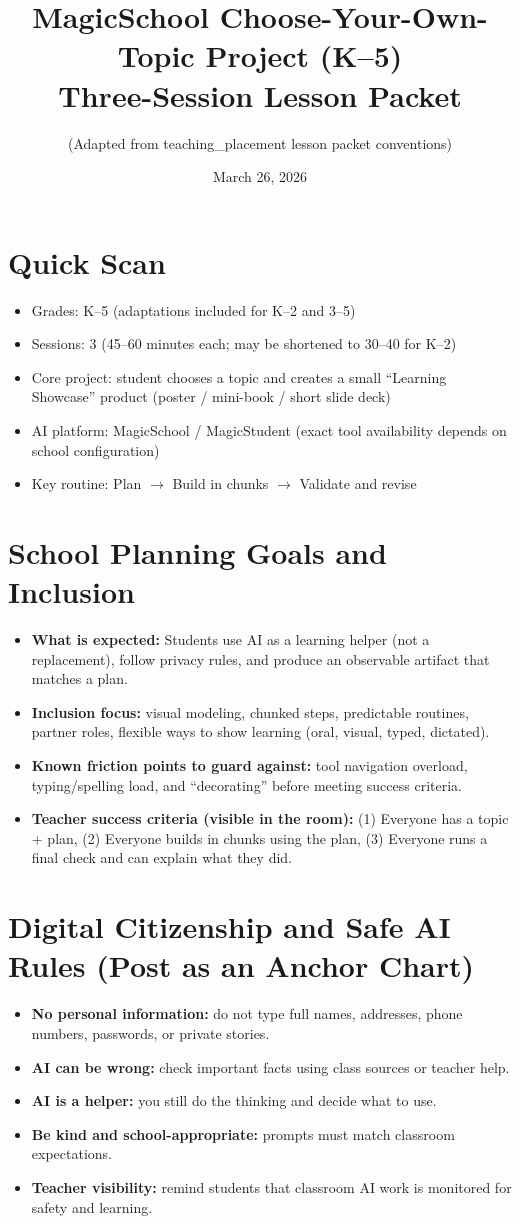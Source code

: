 \documentclass[11pt]{article}
\title{MagicSchool Choose-Your-Own-Topic Project (K--5)\\\large Three-Session Lesson Packet}
\author{(Adapted from teaching\_placement lesson packet conventions)}
\date{March 26, 2026}
\newcommand{\Session}[1]{\section*{#1}}
\begin{document}
\maketitle

\Session{Quick Scan}
\begin{itemize}[leftmargin=*]
  \item Grades: K--5 (adaptations included for K--2 and 3--5)
  \item Sessions: 3 (45--60 minutes each; may be shortened to 30--40 for K--2)
  \item Core project: student chooses a topic and creates a small ``Learning Showcase'' product (poster / mini-book / short slide deck)
  \item AI platform: MagicSchool / MagicStudent (exact tool availability depends on school configuration)
  \item Key routine: Plan $\rightarrow$ Build in chunks $\rightarrow$ Validate and revise
\end{itemize}

\Session{School Planning Goals and Inclusion}
\begin{itemize}[leftmargin=*]
  \item \textbf{What is expected:}
  Students use AI as a learning helper (not a replacement), follow privacy rules, and produce an observable artifact that matches a plan.
  \item \textbf{Inclusion focus:}
  visual modeling, chunked steps, predictable routines, partner roles, flexible ways to show learning (oral, visual, typed, dictated).
  \item \textbf{Known friction points to guard against:}
  tool navigation overload, typing/spelling load, and ``decorating'' before meeting success criteria.
  \item \textbf{Teacher success criteria (visible in the room):}
  (1) Everyone has a topic + plan, (2) Everyone builds in chunks using the plan, (3) Everyone runs a final check and can explain what they did.
\end{itemize}

\Session{Digital Citizenship and Safe AI Rules (Post as an Anchor Chart)}
\begin{itemize}[leftmargin=*]
  \item \textbf{No personal information:} do not type full names, addresses, phone numbers, passwords, or private stories.
  \item \textbf{AI can be wrong:} check important facts using class sources or teacher help.
  \item \textbf{AI is a helper:} you still do the thinking and decide what to use.
  \item \textbf{Be kind and school-appropriate:} prompts must match classroom expectations.
  \item \textbf{Teacher visibility:} remind students that classroom AI work is monitored for safety and learning.
\end{itemize}
\end{document}
